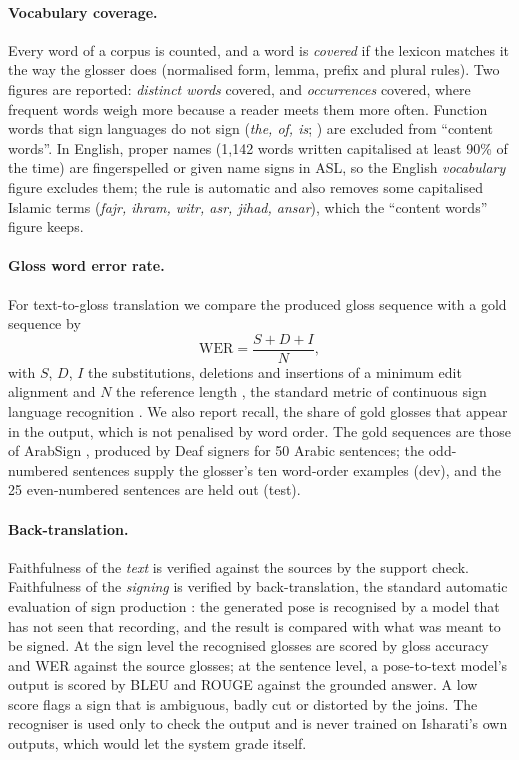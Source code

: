\paragraph{Vocabulary coverage.} Every word of a corpus is counted, and a word is \emph{covered} if the lexicon matches
it the way the glosser does (normalised form, lemma, prefix and plural rules). Two figures are reported: \emph{distinct
words} covered, and \emph{occurrences} covered, where frequent words weigh more because a reader meets them more often.
Function words that sign languages do not sign (\emph{the, of, is}; ) are excluded from ``content words''.
In English, proper names (1,142 words written capitalised at least 90\% of the time) are fingerspelled or given name
signs in ASL, so the English \emph{vocabulary} figure excludes them; the rule is automatic and also removes some
capitalised Islamic terms (\emph{fajr, ihram, witr, asr, jihad, ansar}), which the ``content words'' figure keeps.

\paragraph{Gloss word error rate.} For text-to-gloss translation we compare the produced gloss sequence with a gold
sequence by
\begin{equation}
\mathrm{WER} = \frac{S + D + I}{N},
\end{equation}
with $S$, $D$, $I$ the substitutions, deletions and insertions of a minimum edit alignment and $N$ the reference length
\cite{wer}, the standard metric of continuous sign language recognition \cite{koller2015,signlanguagetransformers}. We
also report recall, the share of gold glosses that appear in the output, which is not penalised by word order. The gold
sequences are those of ArabSign \cite{arabsign}, produced by Deaf signers for 50 Arabic sentences; the odd-numbered
sentences supply the glosser's ten word-order examples (dev), and the 25 even-numbered sentences are held out (test).

\paragraph{Back-translation.} Faithfulness of the \emph{text} is verified against the sources by the support check.
Faithfulness of the \emph{signing} is verified by back-translation, the standard automatic evaluation of sign
production \cite{progressivetransformers}: the generated pose is recognised by a model that has not seen that
recording, and the result is compared with what was meant to be signed. At the sign level the recognised glosses are
scored by gloss accuracy and WER against the source glosses; at the sentence level, a pose-to-text model's output is
scored by BLEU \cite{bleu} and ROUGE \cite{rouge} against the grounded answer. A low score flags a sign that is
ambiguous, badly cut or distorted by the joins. The recogniser is used only to check the output and is never trained on
Isharati's own outputs, which would let the system grade itself.

